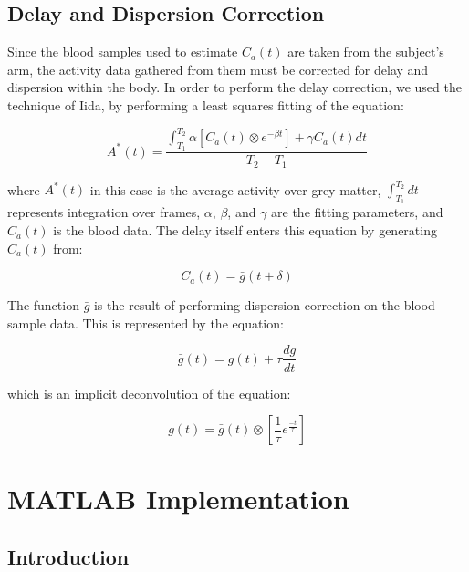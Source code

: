 \subsection{Delay and Dispersion Correction}

Since the blood samples used to estimate $C_a(t)$ are taken from the
subject's arm, the activity data gathered from them must be corrected
for delay and dispersion within the body.  In order to perform the
delay correction, we used the technique of Iida, by performing a
least squares fitting of the equation:

\begin{equation}
A^{*}(t) = \frac{\int_{T_1}^{T_2} \alpha \left[ C_a(t) \otimes e^{-\beta
t} \right] + \gamma C_a(t) dt}{T_2 - T_1} \label{eq:delay_correc}
\end{equation}

where $A^{*}(t)$ in this case is the average activity over grey
matter, $\int_{T_1}^{T_2}dt$ represents integration over frames,
$\alpha$, $\beta$, and $\gamma$ are the fitting parameters, and
$C_a(t)$ is the blood data.  The delay itself enters this equation by
generating $C_a(t)$ from:

\begin{equation}
C_a(t) = \bar{g}(t+\delta)
\end{equation}

The function $\bar{g}$ is the result of performing dispersion
correction on the blood sample data.  This is represented by the
equation:

\begin{equation}
\bar{g}(t) = g(t) + \tau \frac{dg}{dt}
\end{equation}

which is an implicit deconvolution of the equation:

\begin{equation}
g(t) = \bar{g}(t) \otimes \left[ \frac{1}{\tau} e^{\frac{-t}{\tau}}
\right]
\end{equation}


\newpage
\section{MATLAB Implementation}

\subsection{Introduction}


